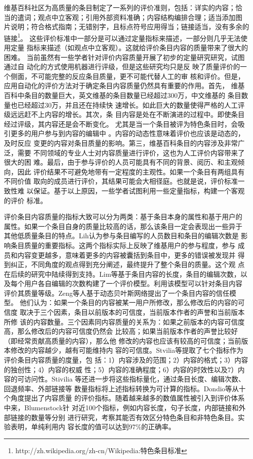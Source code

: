维基百科社区为高质量的条目制定了一系列的评价准则，包括：详实的内容；恰
当的遣词；观点中立客观；引用外部资料准确；内容结构编排合理；适当添加图
片说明；符合格式指南；无错别字，且标点符号应用得当；链接适当，没有多余的链接\footnote{http://zh.wikipedia.org/zh-cn/Wikipedia:特色条目标准}。
这些评价标准中一部分是可以通过定量指标来描述，一部分则几乎无法使用定量
指标来描述（如观点中立客观）。这就给评价条目内容的质量带来了很大的困难。
当前虽然有一些学者针对评价内容质量开展了初步的定量研究研究，试图通过自
动化的方式使用机器进行评级，但是这些研究均只是反
映了质量评价的一个侧面，不可能完整的反应条目质量，更不可能代替人工的审
核和评价。但是，应用自动化的评价方法对于确定条目内容质量仍然具有重要的作用。首先，
维基百科中条目的数量巨大，英文维基的条目数量已经超过300万，中文维基的
条目数量也已经超过30万，并且还在持续快
速增长。如此巨大的数量使得严格的人工评级远远赶不上内容的增长。其次，条
目内容是处在不断演进的过程中。即使条目经过评级，其内容还是会不断变化。
尤其是当一个条目被评为特色条目时，会吸引更多的用户参与到内容的编辑中
\cite{1641333}。内容的动态性意味着评价也应该是动态的，及时反应
变更的内容对条目质量的影响。第三，维基百科条目的内容涉及非常广泛，需要
不同领域的专业人士对内容质量进行评价，这也为人工评价内容带来了很大的困
难。最后，由于参与评价的人员可能具有不同的背景、阅历、和主观倾向，因此
评价结果不可避免地带有一定程度的主观性。如果一个条目有两组具有不同价值
取向的成员进行评价，其结果可能会大相径庭。也就是说，评价标准一致性难
以保证。基于以上原因，一些学者试图利用一些定量指标，构建一个客观的评价
标准。

评价条目内容质量的指标大致可以分为两类：基于条目本身的属性和基于用户的
属性。如果一个条目自身的质量比较高的话，那么该条目一定会表现出一些异于
其他低质量条目的特点。Lih认为参与条目编写的人员数目和条目的编辑次数是
影响条目质量的重要指标。这两个指标实际上反映了维基用户的参与程度，参与
成员和内容变更越多，意味着更多的内容被囊括到条目中，更多的错误被发现并
得到纠正，不同角度的观点得到充分阐述，最终提升了整个条目的质量。这个观
点在后续的研究中陆续得到支持。Lim等基于条目内容的长度，条目的编辑次数，以
及每个用户各自编辑的次数构建了一个评价模型。利用该模型可以针对条目内容
评价其质量等级。Zeng等人基于动态贝叶斯网络提出了一个条目内容的信任模型。
他们认为：如果一个条目的内容被某一用户所修改，那么修改后的内容的可信度
取决于三个因素，条目以前版本的可信度，当前版本作者的声誉和当前版本所修
该的内容数量。三个因素同内容质量的关系为：如果之前版本的内容可信度高，那么修改后的内容可信度仍然会
比较高；如果当前版本作者的声誉比较好（即经常贡献高质量的内容），那么他
修改的内容也应该有较高的可信度；当前版本修改的内容越少，越有可能维持内
容的可信度。Stvilia等提取了七个指标作为评价条目内容质量的度量，包
括：1）内容涉及的范围；2）内容的格式；3）内容的独创性；4）内容的权威
性；5）内容的准确程度；6）内容的时效性以及7）内容的可访问性。Stivilia
等还进一步将这些指标量化，通过条目长度、编辑次数、回退频率、外部链接等
数量指标将上述指标转换为可计算的指标。Dondio等从十个角度提出了内容质量
的评价指标。随着越来越多的数值属性被引入到评价体系中来，Blumenstock针
对近100个指标，例如内容长度，句子长度，内部链接和外部链接的数量等分别
进行研究，考察其能否有效区分特色条目和非特色条目。实验表明，单纯利用内
容长度的值可以达到$97\%$的正确率\cite{1367673}。

